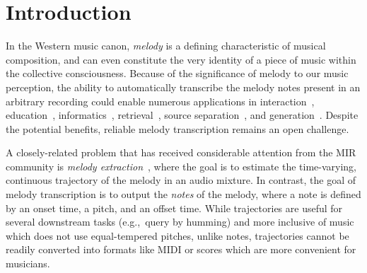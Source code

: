 \section{Introduction}\label{sec:introduction}

In the Western music canon, 
\emph{melody} is a defining characteristic of musical composition, 
and can even constitute the very identity of a piece of music within the collective consciousness. 
Because of the significance of melody to our music perception, 
the ability to automatically transcribe the melody notes present in an arbitrary recording 
could enable numerous applications in 
interaction~\cite{ryynanen2008accompaniment}, 
education~\cite{droe2006music}, 
informatics~\cite{bainbridge1999towards}, 
retrieval~\cite{ghias1995query}, 
source separation~\cite{ewert2014score},
and generation~\cite{hawthorne2019enabling}.
Despite the potential benefits, 
reliable melody transcription remains an open challenge.%

A closely-related problem that has received considerable attention from the MIR community is \emph{melody extraction}~\cite{goto1999real,goto2004real,salamon2014melody,rao2022melody}, where the goal is to estimate the time-varying, continuous \fnot{} trajectory of the melody in an audio mixture. 
In contrast, the goal of melody transcription is to output the \emph{notes} of the melody, where a note is defined by an onset time, a pitch, and an offset time. 
While \fnot{} trajectories are useful for several downstream tasks (e.g.,~query by humming) and more inclusive of music which does not use equal-tempered pitches, unlike notes, trajectories cannot be readily converted into formats like MIDI or scores which are more convenient for musicians.

